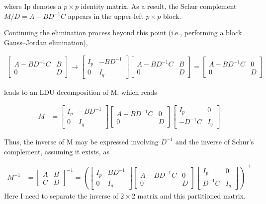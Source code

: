 \documentclass[11pt]{article} %
\begin{document}
where Ip denotes a $p \times p$ identity matrix. As a result, the Schur complement $ M/D=A-BD^{-1}C$ appears in the upper-left $p \times p$ block.

Continuing the elimination process beyond this point (i.e., performing a block Gauss–Jordan elimination),

\begin{align*}
\begin{bmatrix}
		A - BD^{-1}C & B \\
		0 & D
	\end{bmatrix} \rightarrow \begin{bmatrix}
	I_{p} & -BD^{-1} \\
	0 & I_{q}
\end{bmatrix} \begin{bmatrix}
A - BD^{-1}C & B \\
0 & D
\end{bmatrix} = \begin{bmatrix}
A - BD^{-1}C & 0 \\
0 & D
\end{bmatrix} 
\end{align*}

leads to an LDU decomposition of M, which reads

\begin{align*}
	M &= \begin{bmatrix}
	I_{p} & -BD^{-1} \\
	0 & I_{q}
\end{bmatrix}  \begin{bmatrix}
		A - BD^{-1}C & 0 \\
		0 & D
	\end{bmatrix}  \begin{bmatrix}
	I_{p} & 0 \\
	-D^{-1}C & I_{q}
\end{bmatrix}
\end{align*}

Thus, the inverse of M may be expressed involving $D^{-1}$ and the inverse of Schur's complement, assuming it exists, as

\begin{align*}
	M^{-1} &= \begin{bmatrix}
		A & B \\
		C & D
	\end{bmatrix}^{-1} = \left(\begin{bmatrix}
	I_{p} & BD^{-1} \\
	0 & I_{q}
\end{bmatrix}  \begin{bmatrix}
A - BD^{-1}C & 0 \\
0 & D
\end{bmatrix}  \begin{bmatrix}
I_{p} & 0 \\
D^{-1}C & I_{q}
\end{bmatrix} \right)^{-1} 
\end{align*}
Here I need to separate the inverse of $2 \times 2$ matrix and this partitioned matrix. 
\end{document}
